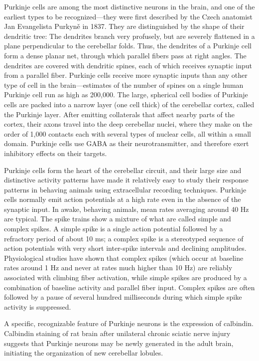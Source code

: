 Purkinje cells are among the most distinctive neurons in the brain, and one of the earliest types to be recognized---they were first described by the Czech anatomist Jan Evangelista Purkyně in 1837. They are distinguished by the shape of their dendritic tree: The dendrites branch very profusely, but are severely flattened in a plane perpendicular to the cerebellar folds. Thus, the dendrites of a Purkinje cell form a dense planar net, through which parallel fibers pass at right angles. The dendrites are covered with dendritic spines, each of which receives synaptic input from a parallel fiber. Purkinje cells receive more synaptic inputs than any other type of cell in the brain---estimates of the number of spines on a single human Purkinje cell run as high as 200,000. The large, spherical cell bodies of Purkinje cells are packed into a narrow layer (one cell thick) of the cerebellar cortex, called the Purkinje layer. After emitting collaterals that affect nearby parts of the cortex, their axons travel into the deep cerebellar nuclei, where they make on the order of 1,000 contacts each with several types of nuclear cells, all within a small domain. Purkinje cells use GABA as their neurotransmitter, and therefore exert inhibitory effects on their targets.

Purkinje cells form the heart of the cerebellar circuit, and their large size and distinctive activity patterns have made it relatively easy to study their response patterns in behaving animals using extracellular recording techniques. Purkinje cells normally emit action potentials at a high rate even in the absence of the synaptic input. In awake, behaving animals, mean rates averaging around 40 Hz are typical. The spike trains show a mixture of what are called simple and complex spikes. A simple spike is a single action potential followed by a refractory period of about 10 ms; a complex spike is a stereotyped sequence of action potentials with very short inter-spike intervals and declining amplitudes. Physiological studies have shown that complex spikes (which occur at baseline rates around 1 Hz and never at rates much higher than 10 Hz) are reliably associated with climbing fiber activation, while simple spikes are produced by a combination of baseline activity and parallel fiber input. Complex spikes are often followed by a pause of several hundred milliseconds during which simple spike activity is suppressed.

A specific, recognizable feature of Purkinje neurons is the expression of calbindin. Calbindin staining of rat brain after unilateral chronic sciatic nerve injury suggests that Purkinje neurons may be newly generated in the adult brain, initiating the organization of new cerebellar lobules.

